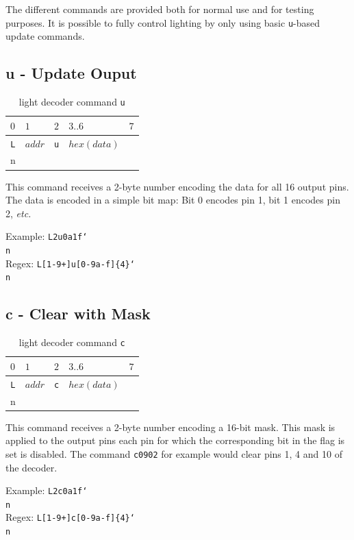 \documentclass{scrreprt}
\newcommand\n{\char`\\n}
\begin{document}
The different commands are provided both for normal use and for testing purposes.
It is possible to fully control lighting by only using basic \texttt{u}-based update commands.

\subsection{u - Update Ouput}
\begin{table}[ht!]
\centering
\begin{tabular}{ |c|c||c|c||c| } 
\multicolumn{1}{l}{$0$} & \multicolumn{1}{l}{$1$} & \multicolumn{1}{l}{$2$} & \multicolumn{1}{l}{$3..6$} & \multicolumn{1}{l}{$7$} \\ \hline
\texttt{L} & $addr$ & \texttt{u} & $hex(data)$ & \texttt{\n} \\\hline
\end{tabular}
\caption{light decoder command \texttt{u}}
\end{table}

This command receives a 2-byte number encoding the data for all 16 output pins.
The data is encoded in a simple bit map:
Bit 0 encodes pin 1, bit 1 encodes pin 2, \emph{etc.}

Example: \texttt{L2u0a1f\n} \\
Regex: \texttt{L[1-9+]u[0-9a-f]\{4\}\n}

\subsection{c - Clear with Mask}
\begin{table}[ht!]
\centering
\begin{tabular}{ |c|c||c|c||c| } 
\multicolumn{1}{l}{$0$} & \multicolumn{1}{l}{$1$} & \multicolumn{1}{l}{$2$} & \multicolumn{1}{l}{$3..6$} & \multicolumn{1}{l}{$7$} \\ \hline
\texttt{L} & $addr$ & \texttt{c} & $hex(data)$ & \texttt{\n} \\\hline
\end{tabular}
\caption{light decoder command \texttt{c}}
\end{table}

This command receives a 2-byte number encoding a 16-bit mask.
This mask is applied to the output pins each pin for which the corresponding bit in the flag is set is disabled. The command \texttt{c0902} for example would clear pins 1, 4 and 10 of the decoder.

Example: \texttt{L2c0a1f\n} \\
Regex: \texttt{L[1-9+]c[0-9a-f]\{4\}\n}
\end{document}

